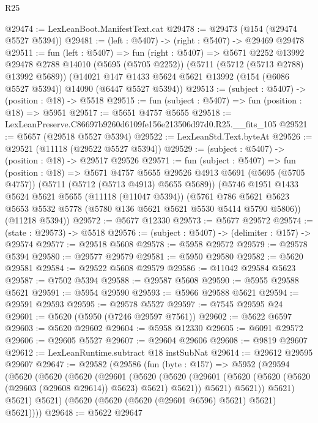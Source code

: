 \begin{lexlean}{R25}
\begin{coremodule}
@29474 := LexLeanBoot.ManifestText.cat
@29478 := @29473 (@154 (@29474 @5527 @5394))
@29481 := (left : @5407) -> (right : @5407) -> @29469 @29478
@29511 := fun (left : @5407) =>
  fun (right : @5407) =>
  @5671
    @2252
    @13992
    @29478
    @2788
    @14010
    (@5695 (@5705 @2252))
    (@5711 (@5712 (@5713 @2788) @13992 @5689))
    (@14021 @147 @1433 @5624 @5621 @13992 (@154 (@6086 @5527 @5394)) @14090 (@6447 @5527 @5394))
@29513 := (subject : @5407) -> (position : @18) -> @5518
@29515 := fun (subject : @5407) => fun (position : @18) => @5951
@29517 := @5651 @4757 @5655
@29518 := LexLeanPreserve.C86697b9260d6109fe156e213506d97d0.R25.__fits_105
@29521 := @5657 (@29518 @5527 @5394)
@29522 := LexLeanStd.Text.byteAt
@29526 := @29521 (@11118 (@29522 @5527 @5394))
@29529 := (subject : @5407) -> (position : @18) -> @29517 @29526
@29571 := fun (subject : @5407) =>
  fun (position : @18) =>
  @5671
    @4757
    @5655
    @29526
    @4913
    @5691
    (@5695 (@5705 @4757))
    (@5711 (@5712 (@5713 @4913) @5655 @5689))
    (@5746
      @1951
      @1433
      @5624
      @5621
      @5655
      (@11118 (@11047 @5394))
      (@5761 @786 @5621 @5623 @5653 @5532 @5778 (@5780 @136 @5621 @5621 @5530 @5414 @5790 @5806))
      (@11218 @5394))
@29572 := @5677 @12330
@29573 := @5677 @29572
@29574 := (state : @29573) -> @5518
@29576 := (subject : @5407) -> (delimiter : @157) -> @29574
@29577 := @29518 @5608
@29578 := @5958 @29572
@29579 := @29578 @5394
@29580 := @29577 @29579
@29581 := @5950 @29580
@29582 := @5620 @29581
@29584 := @29522 @5608 @29579
@29586 := @11042 @29584 @5623
@29587 := @7502 @5394
@29588 := @29587 @5608
@29590 := @5955 @29588 @5621
@29591 := @5954 @29590
@29593 := @5966 @29588 @5621
@29594 := @29591 @29593
@29595 := @29578 @5527
@29597 := @7545 @29595 @24
@29601 := @5620 (@5950 (@7246 @29597 @7561))
@29602 := @5622 @6597
@29603 := @5620 @29602
@29604 := @5958 @12330
@29605 := @6091 @29572
@29606 := @29605 @5527
@29607 := @29604 @29606
@29608 := @9819 @29607
@29612 := LexLeanRuntime.subtract @18 instSubNat
@29614 := @29612 @29595 @29607
@29647 := @29582
    (@29586
      (fun (byte : @157) =>
      @5952
        (@29594
          (@5620
            (@5620
              (@5620
                (@29601
                  (@5620
                    (@5620
                      (@29601 (@5620 (@5620 (@5620 (@29603 (@29608 @29614)) @5623) @5621) @5621))
                      @5621)
                    @5621))
                @5621)
              @5621)
            @5621)
          (@5620 (@5620 (@5620 (@29601 @6596) @5621) @5621) @5621))))
@29648 := @5622 @29647

\end{coremodule}
\end{lexlean}
